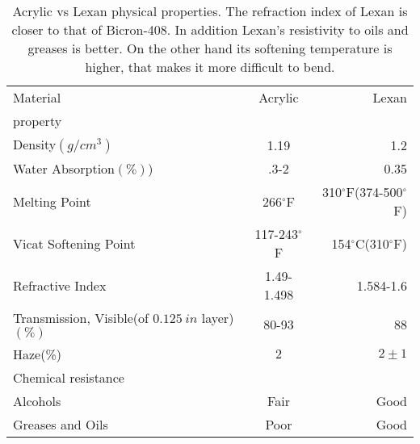 \begin{table}[htbp]
\begin{center}
\begin{tabular}{|l|c|r|} \hline
Material 		&Acrylic      	& Lexan         \\
property  		&               &               \\ \hline
Density$(g/cm^3)$  	& 1.19 		& 1.2 		\\ \hline
Water Absorption$(\%)$)	& .3-2 		&0.35		\\ \hline
Melting Point   	& 266$^\circ$F		&310$^\circ$F(374-500$^\circ$F)\\ \hline
Vicat Softening Point 	& 117-243$^\circ$F	&154$^\circ$C(310$^\circ$F)	\\ \hline
Refractive Index        & 1.49-1.498	&1.584-1.6	\\ \hline
Transmission, Visible(of $0.125~in$ layer)$(\%)$ & 80-93     	&88             \\ \hline
Haze(\%)    		& $2$         &  $2\pm1$               \\ \hline
Chemical resistance     &        ~       &    ~           \\
Alcohols 		& Fair		&Good		\\ \hline
Greases and Oils	& Poor 		&Good		\\ \hline
\end{tabular}
\caption{Acrylic vs Lexan physical properties. 
The refraction index of Lexan  is closer to that of Bicron-408. 
In addition Lexan's 
resistivity to oils and greases is better.  
On the other hand its softening temperature is higher, 
that makes it more difficult to 
bend.\label{table3}}
\end{center}
\end{table}








